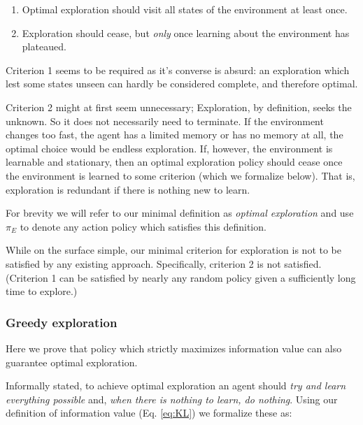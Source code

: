 \documentclass[9pt,twocolumn,twoside]{pnas-new}
\begin{document}
\begin{enumerate}[noitemsep,wide=0pt,leftmargin=\dimexpr\labelwidth+2\labelsep\relax]
    \item Optimal exploration should visit all states of the environment at least once. 
    \item Exploration should cease, but \textit{only} once learning about the environment has plateaued. 
\end{enumerate}

Criterion 1 seems to be required as it's converse is absurd: an exploration which lest some states unseen can hardly be considered complete, and therefore optimal.

Criterion 2 might at first seem unnecessary; Exploration, by definition, seeks the unknown. So it does not necessarily need to terminate. If the environment changes too fast, the agent has a limited memory or has no memory at all, the optimal choice would be endless exploration. If, however, the environment is learnable and stationary, then an optimal exploration policy should cease once the environment is learned to some criterion (which we formalize below). That is, exploration is redundant if there is nothing new to learn.

For brevity we will refer to our minimal definition as \textit{optimal exploration} and use $\pi_E$ to denote any action policy which satisfies this definition.

While on the surface simple, our minimal criterion for exploration is not  to be satisfied by any existing approach. Specifically, criterion 2 is not satisfied. (Criterion 1 can be satisfied by nearly any random policy given a sufficiently long time to explore.) %


\subsubsection*{Greedy exploration} 
Here we prove that policy which strictly maximizes information value can also guarantee optimal exploration. 

Informally stated, to achieve optimal exploration an agent should \textit{try and learn everything possible} and, \textit{when there is nothing to learn, do nothing}. Using our definition of information value (Eq. \ref{eq:KL}) we formalize these as:
\end{document}
